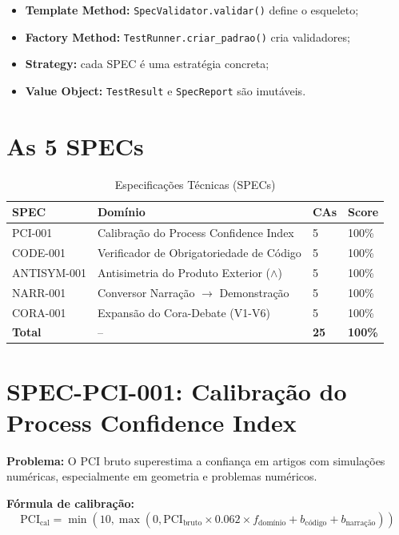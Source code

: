 \documentclass[12pt,a4paper,sumario=tradicional]{abntex2}
\begin{document}
\begin{itemize}
    \item \textbf{Template Method:} \texttt{SpecValidator.validar()} define o esqueleto;
    \item \textbf{Factory Method:} \texttt{TestRunner.criar\_padrao()} cria validadores;
    \item \textbf{Strategy:} cada SPEC é uma estratégia concreta;
    \item \textbf{Value Object:} \texttt{TestResult} e \texttt{SpecReport} são imutáveis.
\end{itemize}

\section{As 5 SPECs}

\begin{longtable}{@{}llll@{}}
\caption{Especificações Técnicas (SPECs)}\\
\toprule
\textbf{SPEC} & \textbf{Domínio} & \textbf{CAs} & \textbf{Score} \\
\midrule
PCI-001 & Calibração do Process Confidence Index & 5 & 100\% \\
CODE-001 & Verificador de Obrigatoriedade de Código & 5 & 100\% \\
ANTISYM-001 & Antisimetria do Produto Exterior ($\wedge$) & 5 & 100\% \\
NARR-001 & Conversor Narração $\to$ Demonstração & 5 & 100\% \\
CORA-001 & Expansão do Cora-Debate (V1-V6) & 5 & 100\% \\
\midrule
\textbf{Total} & -- & \textbf{25} & \textbf{100\%} \\
\bottomrule
\end{longtable}

\section{SPEC-PCI-001: Calibração do Process Confidence Index}

\textbf{Problema:} O PCI bruto superestima a confiança em artigos com simulações numéricas, especialmente em geometria e problemas numéricos.

\textbf{Fórmula de calibração:}
\begin{equation}
    \text{PCI}_{\text{cal}} = \min(10, \max(0, \text{PCI}_{\text{bruto}} \times 0.062 \times f_{\text{domínio}} + b_{\text{código}} + b_{\text{narração}}))
\end{equation}
\end{document}
